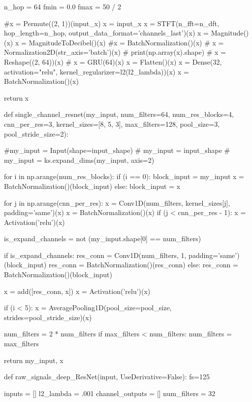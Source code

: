 \begin{python}
    n_hop = 64
    fmin = 0.0
    fmax = 50 / 2

    #x = Permute((2, 1))(input_x)
    x = input_x
    x = STFT(n_fft=n_dft, hop_length=n_hop, output_data_format='channels_last')(x)
    x = Magnitude()(x)
    x = MagnitudeToDecibel()(x)
   #x = BatchNormalization()(x)
    # x = Normalization2D(str_axis='batch')(x)
    # print(np.array(x).shape)
    # x = Reshape((2, 64))(x)
    # x = GRU(64)(x)
    x = Flatten()(x)
    x = Dense(32, activation="relu", kernel_regularizer=l2(l2_lambda))(x)
    x = BatchNormalization()(x)

    return x


def single_channel_resnet(my_input, num_filters=64, num_res_blocks=4, cnn_per_res=3,
                          kernel_sizes=[8, 5, 3], max_filters=128, pool_size=3, pool_stride_size=2):

    #my_input = Input(shape=input_shape)
    # my_input = input_shape
    # my_input = ks.expand_dims(my_input, axis=2)

    for i in np.arange(num_res_blocks):
        if (i == 0):
            block_input = my_input
            x = BatchNormalization()(block_input)
        else:
            block_input = x

        for j in np.arange(cnn_per_res):
            x = Conv1D(num_filters, kernel_sizes[j], padding='same')(x)
            x = BatchNormalization()(x)
            if (j < cnn_per_res - 1):
                x = Activation('relu')(x)

        is_expand_channels = not (my_input.shape[0] == num_filters)

        if is_expand_channels:
            res_conn = Conv1D(num_filters, 1, padding='same')(block_input)
            res_conn = BatchNormalization()(res_conn)
        else:
            res_conn = BatchNormalization()(block_input)

        x = add([res_conn, x])
        x = Activation('relu')(x)

        if (i < 5):
            x = AveragePooling1D(pool_size=pool_size, strides=pool_stride_size)(x)

        num_filters = 2 * num_filters
        if max_filters < num_filters:
            num_filters = max_filters

    return my_input, x


def raw_signals_deep_ResNet(input, UseDerivative=False):
    fs=125

    inputs = []
    l2_lambda = .001
    channel_outputs = []
    num_filters = 32


\end{python}
